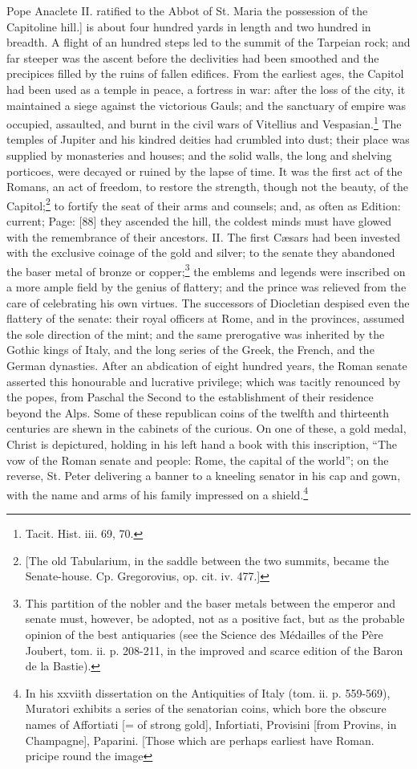 {Pope Anaclete II. ratified to the Abbot of St. Maria the possession of the Capitoline hill.]} is about four hundred yards in length and two hundred in breadth. A flight of an hundred steps led to the summit of the Tarpeian rock; and far steeper was the ascent before the declivities had been smoothed and the precipices filled by the ruins of fallen edifices. From the earliest ages, the Capitol had been used as a temple in peace, a fortress in war: after the loss of the city, it maintained a siege against the victorious Gauls; and the sanctuary of empire was occupied, assaulted, and burnt in the civil wars of Vitellius and Vespasian.\footnote{Tacit. Hist. iii. 69, 70.} The temples of Jupiter and his kindred deities had crumbled into dust; their place was supplied by monasteries and houses; and the solid walls, the long and shelving porticoes, were decayed or ruined by the lapse of time. It was the first act of the Romans, an act of freedom, to restore the strength, though not the beauty, of the Capitol;\footnote{[The old Tabularium, in the saddle between the two summits, became the Senate-house. Cp. Gregorovius, op. cit. iv. 477.]} to fortify the seat of their arms and counsels; and, as often as Edition: current; Page: [88] they ascended the hill, the coldest minds must have glowed with the remembrance of their ancestors. II. The first Cæsars had been invested with the exclusive coinage of the gold and silver; to the senate they abandoned the baser metal of bronze or copper;\footnote{This partition of the nobler and the baser metals between the emperor and senate must, however, be adopted, not as a positive fact, but as the probable opinion of the best antiquaries (see the Science des Médailles of the Père Joubert, tom. ii. p. 208-211, in the improved and scarce edition of the Baron de la Bastie).} the emblems and legends were inscribed on a more ample field by the genius of flattery; and the prince was relieved from the care of celebrating his own virtues. The successors of Diocletian despised even the flattery of the senate: their royal officers at Rome, and in the provinces, assumed the sole direction of the mint; and the same prerogative was inherited by the Gothic kings of Italy, and the long series of the Greek, the French, and the German dynasties. After an abdication of eight hundred years, the Roman senate asserted this honourable and lucrative privilege; which was tacitly renounced by the popes, from Paschal the Second to the establishment of their residence beyond the Alps. Some of these republican coins of the twelfth and thirteenth centuries are shewn in the cabinets of the curious. On one of these, a gold medal, Christ is depictured, holding in his left hand a book with this inscription, \texthebrew{“}The vow of the Roman senate and people: Rome, the capital of the world\texthebrew{}”; on the reverse, St. Peter delivering a banner to a kneeling senator in his cap and gown, with the name and arms of his family impressed on a shield.\footnote{In his xxviith dissertation on the Antiquities of Italy (tom. ii. p. 559-569), Muratori exhibits a series of the senatorian coins, which bore the obscure names of Affortiati [= of strong gold], Infortiati, Provisini [from Provins, in Champagne], Paparini. [Those which are perhaps earliest have Roman. pricipe round the image }
